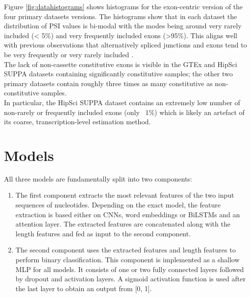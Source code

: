Figure \ref{fig:datahistograms} shows histograms for the exon-centric version of the four primary datasets versions. The histograms show that in each dataset the distribution of PSI values is bi-modal with the modes being around very rarely included (< 5\%) and very frequently included exons (>95\%). This aligns well with previous observations that alternatively spliced junctions and exons tend to be very frequently or very rarely included \cite{buschhertel} \cite{bimodalpsivalues1} \cite{bimodalpsivalues2}.\\
The lack of non-cassette constitutive exons is visible in the GTEx and HipSci SUPPA datasets containing significantly constitutive samples; the other two primary datasets contain roughly three times as many constitutive as non-constitutive samples. \\
In particular, the HipSci SUPPA dataset contains an extremely low number of non-rarely or frequently included exons (only ~1\%) which is likely an artefact of its coarse, transcription-level estimation method.

\section{Models} \label{sec:models}
All three models are fundamentally split into two components: 
\begin{enumerate}
	\item The first component extracts the most relevant features of the two input sequences of nucleotides.  Depending on the exact model, the feature extraction is based either on CNNs, word embeddings or BiLSTMs and an attention layer. The extracted features are concatenated along with the length features and fed as input to the second component. 
	
	\item The second component uses the extracted features and length features to perform binary classification. This component is implemented as a shallow MLP for all models. It consists of one or two fully connected layers followed by dropout and activation layers. A sigmoid activation function is used after the last layer to obtain an output from [0, 1].
\end{enumerate}

